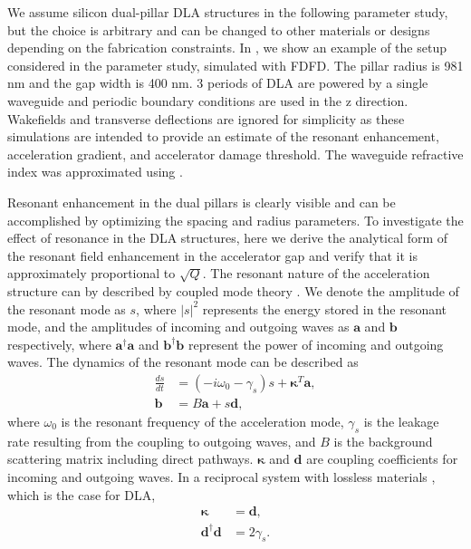 We assume silicon dual-pillar DLA structures in the following parameter study, but the choice is arbitrary and can be changed to other materials or designs depending on the fabrication constraints.
In , we show an example of the setup considered in the parameter study, simulated with FDFD.
The pillar radius is 981 nm and the gap width is 400 nm.
3 periods of DLA are powered by a single waveguide and periodic boundary conditions are used in the z direction.
Wakefields and transverse deflections are ignored for simplicity as these simulations are intended to provide an estimate of the resonant enhancement, acceleration gradient, and accelerator damage threshold.
The waveguide refractive index was approximated using \cite{smotrova2005cold}.

Resonant enhancement in the dual pillars is clearly visible and can be accomplished by optimizing the spacing and radius parameters.
To investigate the effect of resonance in the DLA structures, here we derive the analytical form of the resonant field enhancement in the accelerator gap and verify that it is approximately proportional to $\sqrt{Q}$. The resonant nature of the acceleration structure can by described by coupled mode theory \cite{haus1984waves, suh2004temporal}. We denote the amplitude of the resonant mode as $s$, where $|s|^2$ represents the energy stored in the resonant mode, and the amplitudes of incoming and outgoing waves as $\boldsymbol{a}$ and $\boldsymbol{b}$ respectively, where $\boldsymbol{a}^{\dagger}\boldsymbol{a}$ and $\boldsymbol{b}^{\dagger}\boldsymbol{b}$ represent the power of incoming and outgoing waves. The dynamics of the resonant mode can be described as
\begin{subequations}
\label{eq:CMT}
\begin{align}
\frac{ds}{dt} & = (-i\omega_0 - \gamma_s)s + \boldsymbol{\kappa}^T \boldsymbol{a},\\
\boldsymbol{b} & = B \boldsymbol{a} + s \boldsymbol{d},
\end{align}
\end{subequations}
where $\omega_0$ is the resonant frequency of the acceleration mode, $\gamma_s$ is the leakage rate resulting from the coupling to outgoing waves, and $B$ is the background scattering matrix including direct pathways. $\boldsymbol{\kappa}$ and $\boldsymbol{d}$ are coupling coefficients for incoming and outgoing waves. In a reciprocal system with lossless materials \cite{suh2004temporal}, which is the case for DLA,
\begin{subequations}
\label{eq:CMT_recip}
\begin{align}
\boldsymbol{\kappa} & = \boldsymbol{d}, \\
\boldsymbol{d}^{\dagger} \boldsymbol{d} & = 2 \gamma_s.
\end{align}
\end{subequations}

